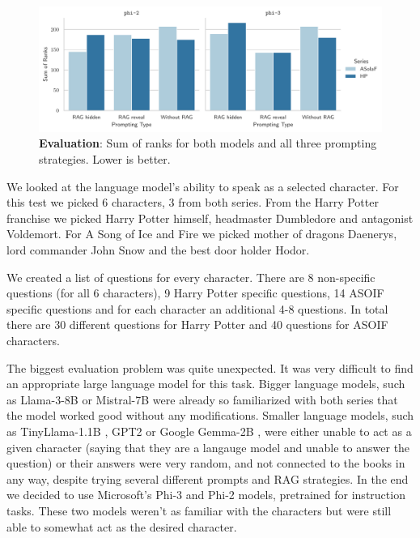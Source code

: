 \documentclass[fleqn,moreauthors,10pt]{ds_report}
\begin{document}
\begin{figure}[hbt]
	\centering
	\includegraphics[width=0.8\linewidth]{questioners-results.pdf}
	\caption{\textbf{Evaluation}: Sum of ranks for both models and all three prompting strategies. Lower is better.}
	\label{fig:character_evaluation_results}
\end{figure}


We looked at the language model's ability to speak as a selected character.
For this test we picked 6 characters, 3 from both series.
From the Harry Potter franchise we picked Harry Potter himself, headmaster Dumbledore and antagonist Voldemort.
For A Song of Ice and Fire we picked mother of dragons Daenerys, lord commander John Snow and the best door holder Hodor.

We created a list of questions for every character.
There are 8 non-specific questions (for all 6 characters), 9 Harry Potter specific questions, 14 ASOIF specific questions
and for each character an additional 4-8 questions.
In total there are 30 different questions for Harry Potter and 40 questions for ASOIF characters.

The biggest evaluation problem was quite unexpected. It was very difficult to find an appropriate large language model for this task.
Bigger language models, such as Llama-3-8B \cite{llama3modelcard} or Mistral-7B \cite{jiang2023mistral} were already so familiarized with both series that the model worked good without any modifications.
Smaller language models, such as TinyLlama-1.1B \cite{zhang2024tinyllama}, GPT2 \cite{radford2019language} or Google Gemma-2B \cite{gemma_2024},
were either unable to act as a given character (saying that they are a langauge model and unable to answer the question)
or their answers were very random, and not connected to the books in any way, despite trying several different prompts and RAG strategies.
In the end we decided to use Microsoft's Phi-3 \cite{abdin2024phi} and Phi-2 models, pretrained for instruction tasks.
These two models weren't as familiar with the characters but were still able to somewhat act as the desired character.
\end{document}
